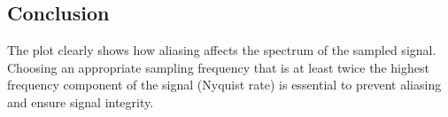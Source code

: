 \subsection*{Conclusion}
The plot clearly shows how aliasing affects the spectrum of the sampled signal. Choosing an appropriate sampling frequency that is at least twice the highest frequency component of the signal (Nyquist rate) is essential to prevent aliasing and ensure signal integrity.
